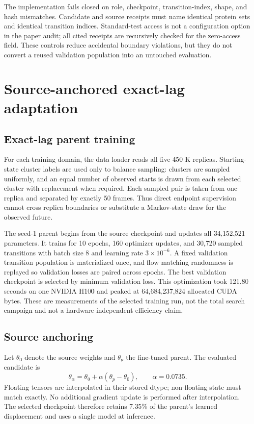 \documentclass{article}
\begin{document}
The implementation fails closed on role, checkpoint, transition-index, shape, and hash mismatches. Candidate and source receipts must name identical protein sets and identical transition indices. Standard-test access is not a configuration option in the paper audit; all cited receipts are recursively checked for the zero-access field. These controls reduce accidental boundary violations, but they do not convert a reused validation population into an untouched evaluation.

\section{Source-anchored exact-lag adaptation}

\subsection{Exact-lag parent training}

For each training domain, the data loader reads all five 450 K replicas. Starting-state cluster labels are used only to balance sampling: clusters are sampled uniformly, and an equal number of observed starts is drawn from each selected cluster with replacement when required. Each sampled pair is taken from one replica and separated by exactly 50 frames. Thus direct endpoint supervision cannot cross replica boundaries or substitute a Markov-state draw for the observed future.

The seed-1 parent begins from the source checkpoint and updates all 34,152,521 parameters. It trains for 10 epochs, 160 optimizer updates, and 30,720 sampled transitions with batch size 8 and learning rate $3 \times 10^{-6}$. A fixed validation transition population is materialized once, and flow-matching randomness is replayed so validation losses are paired across epochs. The best validation checkpoint is selected by minimum validation loss. This optimization took 121.80 seconds on one NVIDIA H100 and peaked at 64,684,237,824 allocated CUDA bytes. These are measurements of the selected training run, not the total search campaign and not a hardware-independent efficiency claim.

\subsection{Source anchoring}

Let $\theta_0$ denote the source weights and $\theta_p$ the fine-tuned parent. The evaluated candidate is
\begin{equation}
  \theta_\alpha = \theta_0 + \alpha(\theta_p - \theta_0), \qquad \alpha = 0.0735.
\end{equation}
Floating tensors are interpolated in their stored dtype; non-floating state must match exactly. No additional gradient update is performed after interpolation. The selected checkpoint therefore retains 7.35\% of the parent's learned displacement and uses a single model at inference.
\end{document}
